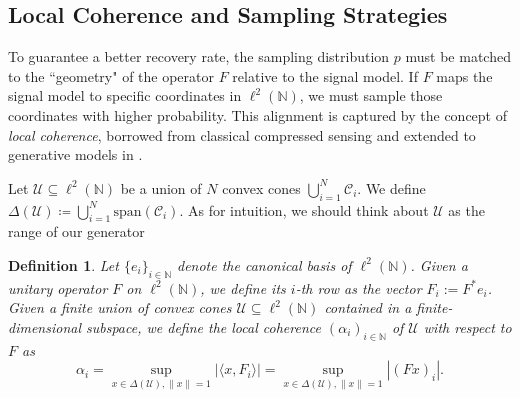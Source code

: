 \documentclass[a4paper,oneside]{amsart}
\newtheorem{definition}{Definition}[section]
\newcommand{\lnn}{\ell^2(\mathbb{N})}
\begin{document}
\subsection{Local Coherence and Sampling Strategies}

To guarantee a better recovery rate, the sampling distribution $p$ must be matched to the ``geometry" of the operator $F$ relative to the signal model. If $F$ maps the signal model to specific coordinates in $\lnn$, we must sample those coordinates with higher probability. This alignment is captured by the concept of \textit{local coherence}, borrowed from classical compressed sensing \cite{candes2007sparsity} and extended to generative models in \cite{Berk22}.

Let $\mathcal{U}\subseteq\lnn$ be a union of $N$ convex cones $\bigcup_{i = 1}^N \mathcal{C}_i$. We define $\Delta(\mathcal{U}) \coloneqq \bigcup_{i = 1}^N \text{span}(\mathcal
{C}_i)$. As for intuition, we should think about $\mathcal{U}$ as the range of our generator
\begin{definition}\label{local-coherence}
    Let $\{e_i\}_{i\in\mathbb{N}}$ denote the canonical basis of $\ell^2(\mathbb{N})$. Given a unitary operator $F$ on $\ell^2(\mathbb{N})$, we define its $i$-th row as the vector $F_i := F^* e_i$.
    Given a finite union of convex cones $\mathcal{U}\subseteq\ell^2(\mathbb{N})$ contained in a finite-dimensional subspace, we define the local coherence $(\alpha_i)_{i\in\mathbb{N}}$ of $\mathcal{U}$ with respect to $F$ as
    \begin{equation} \label{def:loccoh}
        \alpha_i = \sup_{x\in \Delta(\mathcal{U}) ,\|x\|=1} |\langle x, F_i\rangle| = \sup_{x\in \Delta(\mathcal{U}) ,\|x\|=1} |(Fx)_i|.
    \end{equation}
\end{definition}
\end{document}
